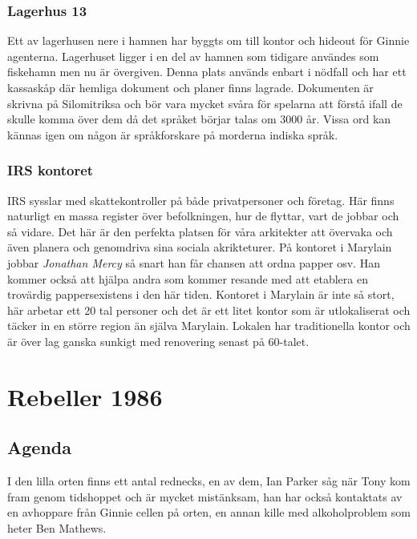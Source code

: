 \documentclass[a5paper,10pt]{report}
\begin{document}
\subsubsection{Lagerhus 13}
Ett av lagerhusen nere i hamnen har byggts om till kontor och hideout för Ginnie agenterna. Lagerhuset ligger i en del av hamnen som tidigare användes som fiskehamn men nu är övergiven. Denna plats används enbart i nödfall och har ett kassaskåp där hemliga dokument och planer finns lagrade. Dokumenten är skrivna på Silomitriksa och bör vara mycket svåra för spelarna att förstå ifall de skulle komma över dem då det språket börjar talas om 3000 år. Vissa ord kan kännas igen om någon är språkforskare på morderna indiska språk.
\subsubsection{IRS kontoret}
IRS sysslar med skattekontroller på både privatpersoner och företag. Här finns naturligt en massa register över befolkningen, hur de flyttar, vart de jobbar och så vidare. Det här är den perfekta platsen för våra arkitekter att övervaka och även planera och genomdriva sina sociala akrikteturer. På kontoret i Marylain jobbar \textit{Jonathan Mercy} så snart han får chansen att ordna papper osv. Han kommer också att hjälpa andra som kommer resande med att etablera en trovärdig pappersexistens i den här tiden. Kontoret i Marylain är inte så stort, här arbetar ett 20 tal personer och det är ett litet kontor som är utlokaliserat och täcker in en större region än själva Marylain. Lokalen har traditionella kontor och är över lag ganska sunkigt med renovering senast på 60-talet.
\section{Rebeller 1986}
\subsection{Agenda}
I den lilla orten finns ett antal rednecks, en av dem, Ian Parker såg när Tony kom fram genom tidshoppet och är mycket mistänksam, han har också kontaktats av en avhoppare från Ginnie cellen på orten, en annan kille med alkoholproblem som heter Ben Mathews.
\end{document}
